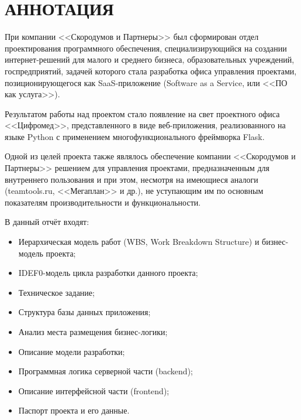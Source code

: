 \documentclass[14pt, a4paper]{extreport}
\begin{document}
\pagestyle{plain}


\newpage
\vspace*{-25mm}
\tableofcontents
\newpage


\chapter{\MakeTextUppercase{Аннотация}}
При компании <<Скородумов и Партнеры>> был сформирован отдел проектирования программного обеспечения, специализирующийся на создании интернет-решений для малого и среднего бизнеса, образовательных учреждений, госпредприятий, задачей которого стала разработка офиса управления проектами, позиционирующегося как SaaS-приложение (Software as a Service, или <<ПО как услуга>>).

Результатом работы над проектом стало появление на свет проектного офиса <<Цифромед>>, представленного в виде веб-приложения, реализованного на языке Python с применением многофункционального фреймворка Flask.

Одной из целей проекта также являлось обеспечение компании <<Скородумов и Партнеры>> решением для управления проектами, предназначенным для внутреннего пользования и при этом, несмотря на имеющиеся аналоги (teamtools.ru, <<Мегаплан>> и др.), не уступающим им по основным показателям производительности и функциональности.


В данный отчёт входят:

\begin{itemize}
\setlength{\itemsep}{-1mm}
\item Иерархическая модель работ (WBS, Work Breakdown Structure) и бизнес-модель проекта;
\item IDEF0-модель цикла разработки данного проекта;
\item Техническое задание;
\item Структура базы данных приложения;
\item Анализ места размещения бизнес-логики;
\item Описание модели разработки;
\item Программная логика серверной части (backend);
\item Описание интерфейсной части (frontend);
\item Паспорт проекта и его данные.
\end{itemize}
\end{document}
